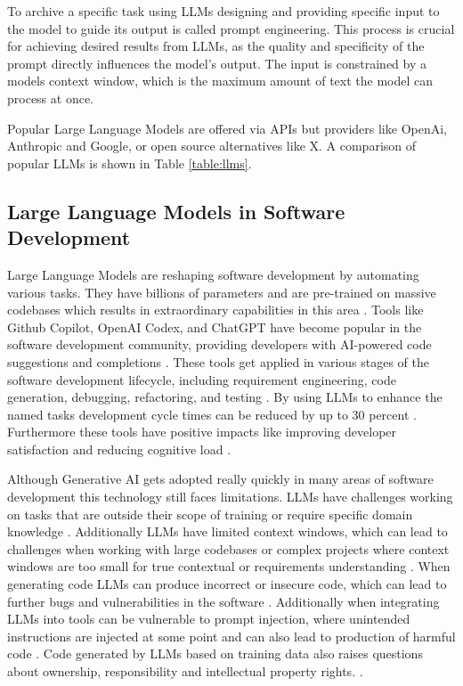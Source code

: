 To archive a specific task using LLMs designing and providing specific input to the model to guide its output is called prompt engineering. This process is crucial for achieving desired results from LLMs, as the quality and specificity of the prompt directly influences the model's output. The input is constrained by a models context window, which is the maximum amount of text the model can process at once.

Popular Large Language Models are offered via APIs but providers like OpenAi, Anthropic and Google, or open source alternatives like X. A comparison of popular LLMs is shown in Table \ref{table:llms}.

\subsection{Large Language Models in Software Development}

Large Language Models are reshaping software development by automating various tasks. They have billions of parameters and are pre-trained on massive codebases which results in extraordinary capabilities in this area \cite{chenUnveilingPitfallsUnderstanding2025}. Tools like Github Copilot, OpenAI Codex, and ChatGPT have become popular in the software development community, providing developers with AI-powered code suggestions and completions \cite{bhargavmallampatiRoleGenerativeAI2025}. These tools get applied in various stages of the software development lifecycle, including requirement engineering, code generation, debugging, refactoring, and testing \cite{houLargeLanguageModels2024, puvvadiCodingAgentsComprehensive2025,bhargavmallampatiRoleGenerativeAI2025}. By using LLMs to enhance the named tasks development cycle times can be reduced by up to 30 percent \cite{bhargavmallampatiRoleGenerativeAI2025,kalliamvakouResearchQuantifyingGitHub2022}. Furthermore these tools have positive impacts like improving developer satisfaction and reducing cognitive load \cite{kalliamvakouResearchQuantifyingGitHub2022}.

Although Generative AI gets adopted really quickly in many areas of software development this technology still faces limitations. LLMs have challenges working on tasks that are outside their scope of training or require specific domain knowledge \cite{houLargeLanguageModels2024}. Additionally LLMs have limited context windows, which can lead to challenges when working with large codebases or complex projects where context windows are too small for true contextual or requirements understanding \cite{bhargavmallampatiRoleGenerativeAI2025}. When generating code LLMs can produce incorrect or insecure code, which can lead to further bugs and vulnerabilities in the software \cite{houLargeLanguageModels2024, bhargavmallampatiRoleGenerativeAI2025}. Additionally when integrating LLMs into tools can be vulnerable to prompt injection, where unintended instructions are injected at some point and can also lead to production of harmful code \cite{liuPromptInjectionAttack2024}. Code generated by LLMs based on training data also raises questions about ownership, responsibility and intellectual property rights. \cite{sauvolaFutureSoftwareDevelopment2024, houLargeLanguageModels2024}.

